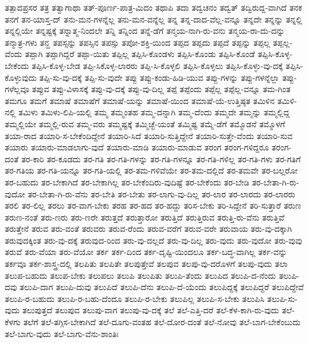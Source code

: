{ತತ್ಪಾದಪ್ರಸರ
ತತ್ರ
ತತ್ವಾಗಾಥಾ
ತತ್‌-ಪೂರ್ಣ-ಪಾತ್ರ-ಮಿದಂ
ತಥಾಪಿ
ತದಾ
ತದ್ವಚನಂ
ತದ್ವತ್
ತದ್ವಿರುದ್ದ-ವಾಗಿದೆ
ತನಕ
ತನಗೆ
ತನ-ಯಾಸ್ತ-‌ದ್
ತನು-ಮನ-ಗಳನ್ನೆಲ್ಲ
ತನು-ಮನ-ವನ್ನೆಲ್ಲ
ತನ್ನ
ತನ್ನ-ದಾದ-ವೆಲ್ಲ-ವನ್ನೂ
ತನ್ನದೇ
ತನ್ನನ್ನು
ತನ್ನಲ್ಲಿ
ತನ್ನಲ್ಲಿಯೇ
ತನ್ನಷ್ಟಕ್ಕೆ
ತನ್ನಾತ್ಮ-ನಿಂದಲೇ
ತನ್ನಿ
ತನ್ನಿಂದ
ತನ್ನೆ-ಡೆಗೆ
ತನ್ಮಯ-ನಾಗಿ-ರು-ವನು
ತನ್ಮಯ-ರಾ-ದು-ದನ್ನು
ತನ್ಮಾತ್ರ-ಗಳು
ತನ್ಹ
ತಪಸ್ಸನ್ನು
ತಪಸ್ಸಿನ
ತಪಸ್ಸು
ತಪೋ-ಶಕ್ತಿ-ಯಿಂದ
ತಪ್ಪದ
ತಪ್ಪದು
ತಪ್ಪದೆ
ತಪ್ಪನ್ನು
ತಪ್ಪಲ್ಲ
ತಪ್ಪಲ್ಲ-ವೆಂದು
ತಪ್ಪಾಗಿ
ತಪ್ಪಾಗಿದ್ದರೆ
ತಪ್ಪಾ-ಯಿತು
ತಪ್ಪಿಲ್ಲ
ತಪ್ಪಿಸಿ-ಕೊಂಡಳು
ತಪ್ಪಿಸಿ-ಕೊಂಡು
ತಪ್ಪಿಸಿ-ಕೊಂಡೆ
ತಪ್ಪಿಸಿ-ಕೊಳ್ಳ-ಬೇಕೆಂದು
ತಪ್ಪಿಸಿ-ಕೊಳ್ಳ-ಬೇಡ
ತಪ್ಪಿ-ಸಿಕೊಳ್ಳ-ಲಾರರು
ತಪ್ಪಿ-ಸಿ-ಕೊಳ್ಳಲಿ
ತಪ್ಪಿಸಿ-ಕೊಳ್ಳಲು
ತಪ್ಪಿಸಿ-ಕೊಳ್ಳು-ವು-ದಕ್ಕೆ
ತಪ್ಪಿಸಿ-ಕೊಳ್ಳುವುದು
ತಪ್ಪಿ-ಸು-ವು-ದಕ್ಕೆ
ತಪ್ಪಿ-ಸು-ವುದೇ
ತಪ್ಪು
ತಪ್ಪು-ಕಂಡು-ಹಿಡಿ-ಯುವ
ತಪ್ಪು-ಗಳನ್ನು
ತಪ್ಪು-ಗಳನ್ನೆಲ್ಲಾ
ತಪ್ಪು-ಗಳೆಲ್ಲವೂ
ತಪ್ಪುವ
ತಪ್ಪು-ವಿಳಾಸಕ್ಕೆ
ತಪ್ಪು-ವು-ದಕ್ಕೆ
ತಪ್ಪು-ವು-ದಿಲ್ಲ
ತಪ್ಪೆ
ತಪ್ಪೆಂದು
ತಪ್ಪೆಲ್ಲ
ತಪ್ಪೆಲ್ಲ-ವನ್ನೂ
ತಮ-ಗಿಂತ
ತಮಗೂ
ತಮಗೆ
ತಮಾಷೆ
ತಮಾಷೆಗೆ
ತಮಾಷೆ-ಯನ್ನು
ತಮಾಷೆ-ಯಿಂದ
ತಮಾಷೆ-ಯೆ-ಉತ್ತಿಷ್ಠತ
ತಮಿಳಿನ
ತಮಿಳಿ-ನಲ್ಲಿ
ತಮಿಳು
ತಮಿಳು-ಲಿಪಿ-ಯಲ್ಲಿ
ತಮ್ಮ
ತಮ್ಮಂತಹ
ತಮ್ಮ-ದನ್ನಾಗಿ
ತಮ್ಮ-ದೆಂದು
ತಮ್ಮದೇ
ತಮ್ಮನ್ನು
ತಮ್ಮಲ್ಲಿದ್ದ
ತಮ್ಮಲ್ಲಿಯೇ
ತಮ್ಮಲ್ಲಿ-ರುವ
ತಮ್ಮ-ವರು
ತಮ್ಮಷ್ಟಕ್ಕೆ
ತಮ್ಮಿಚ್ಛೆ-ಯಂತೆ
ತಮ್ಮಿಷ್ಟ
ತಮ್ಮೆ-ಡೆಗೆ
ತಮ್ಮೊಡನೆ
ತಮ್ಮೊಳಗೆ
ತಯಾ-ರಾದ
ತಯಾರಿ-ಸ-ಬೇಕೆಂದಿದ್ದೇನೆ
ತಯಾರಿ-ಸಿದೆ
ತಯಾರಿ-ಸುತ್ತಿದ್ದೇನೆ
ತಯಾರಿ-ಸುತ್ತೇ-ವೆಂದು
ತಯಾರಿ-ಸುವ
ತಯಾರು
ತಯಾರು-ಮಾಡಲಾಗು-ವುದೆ
ತಯಾರು-ಮಾಡಿ
ತಯಾರು-ಮಾಡುವ
ತರಂಗ
ತರಂಗ-ಗಳಿದ್ದರೂ
ತರಂಗ-ದಂತೆ
ತರ-ಕಾರಿ
ತರ-ಕೂಡದು
ತರ-ಗತಿ
ತರ-ಗತಿ-ಗಳನ್ನು
ತರ-ಗತಿ-ಗಳನ್ನೂ
ತರ-ಗತಿ-ಗಳಿಲ್ಲ
ತರ-ಗತಿ-ಗಳು
ತರ-ಗತಿಗೆ
ತರ-ಗತಿಯ
ತರ-ಗತಿ-ಯನ್ನೂ
ತರ-ಗತಿ-ಯಲ್ಲಿ
ತರ-ತಮ-ಗಳಿವೆಯೇ
ತರ-ತಮ-ದಲ್ಲಿದೆ
ತರ-ತಮವೇ
ತರ-ಬಲ್ಲರೋ
ತರ-ಬಹುದು
ತರ-ಬೇಕಾಗಿದೆ
ತರ-ಬೇಕಾಗಿಲ್ಲ
ತರ-ಬೇಕೆಂದಿರು-ವುದಿಷ್ಟೆ
ತರ-ಬೇಕೆಂದು
ತರ-ಬೇಡಿ
ತರ-ಬೇತಾ-ಗಿ-ರು-ವುದೋ
ತರ-ಬೇತಾ-ಗಿ-ರು-ವೆನು
ತರ-ಬೇತಿ
ತರ-ಬೇತು
ತರ-ಲಾಗು-ವು-ದಿಲ್ಲ
ತರ-ಲಾರ
ತರ-ಲಾರದು
ತರ-ಲಾರರು
ತರಲಿ
ತರ-ಲಿಲ್ಲ
ತರಲು
ತರ-ವಾಗ-ಬೇಕು
ತರಹ
ತರ-ಹದ
ತರ-ಹದ್ದು
ತರಿಸ-ಬೇಕು
ತರಿ-ಸಿದ್ದೇನೆ
ತರಿ-ಸುತ್ತಾರೆ
ತರುಣ
ತರುಣ-ನಂತೆ
ತರು-ಣರು
ತರು-ಣರೇ
ತರುತ್ತದೆ
ತರುತ್ತಾರೋ
ತರುತ್ತಿದೆ
ತರುತ್ತಿರುವ
ತರುತ್ತಿ-ರು-ವೆನು
ತರುತ್ತಿವೆ
ತರುತ್ತೇನೆ
ತರುವ
ತರು-ವಂತೆ
ತರುವರು
ತರುವ-ರೆಂದು
ತರುವ-ವರೆಗೆ
ತರುವ-ವರೇ
ತರುವಾಯ
ತರು-ವು-ದಕ್ಕಾಗಿ
ತರುವುದಕ್ಕಿಂತ
ತರು-ವು-ದಕ್ಕೆ
ತರುವುದ-ರಿಂದ
ತರು-ವು-ದಲ್ಲದೆ
ತರು-ವು-ದಿಲ್ಲ
ತರು-ವುದು
ತರು-ವುದೋ
ತರು-ವುವು
ತರುವೆ
ತರು-ವೆಯಾ
ತರು-ವೆಯೋ
ತರ್ಕ
ತರ್ಕ-ದಿಂದ
ತರ್ಕ-ದೃಷ್ಟಿ-ಯಿಂದಲೂ
ತರ್ಕ-ಬದ್ಧ-ವಾಗಿಲ್ಲ
ತರ್ಕ-ವನ್ನು
ತರ್ಕವೂ
ತರ್ಕ-ಶಾಸ್ತ್ರ-ದಲ್ಲಿ
ತಲಪಿತು
ತಲಪಿತೇ
ತಲಪುತ್ತೇವೆ
ತಲಪುವ
ತಲಪು-ವು-ದರೊಳಗೆ
ತಲಪು-ವುದು
ತಲಾ
ತಲುಪ-ಬಹುದು
ತಲುಪ-ಬೇಕು
ತಲುಪಲು
ತಲುಪಿ
ತಲುಪಿತು
ತಲುಪಿ-ತೆಂದು
ತಲುಪಿದ
ತಲುಪಿ-ದ-ನೆಂದು
ತಲುಪಿ-ದವು
ತಲುಪಿ-ದಾಗ
ತಲುಪಿ-ದುವು
ತಲುಪಿದೆ
ತಲುಪಿ-ದೆನು
ತಲುಪಿ-ದೆ-ಯೆಂದು
ತಲುಪಿದ್ದಕ್ಕೆ
ತಲುಪಿದ್ದರೆ
ತಲುಪಿದ್ದೇವೆ
ತಲುಪಿ-ರ-ಬಹುದು
ತಲುಪಿ-ರ-ಬಹು-ದೆಂದೂ
ತಲುಪಿ-ರ-ಬೇಕು
ತಲುಪಿಲ್ಲ
ತಲುಪಿ-ಸ-ಬೇಕು
ತಲುಪಿಸಿ
ತಲುಪಿ-ಸು-ವುದು
ತಲುಪುತ್ತದೆ
ತಲುಪುವ
ತಲುಪು-ವಾಗ
ತಲುಪು-ವು-ದಕ್ಕೆ
ತಲೆ
ತಲೆ-ಎತ್ತಿ-ದರೆ
ತಲೆ-ಕೆಳ-ಕಾಗಿ-ರು-ವುದು
ತಲೆ-ಕೆಳಗು
ತಲೆಗೆ
ತಲೆ-ತಗ್ಗಿಸ-ಬೇಕಾಗಿದೆ
ತಲೆ-ದೂಗು-ವಂತಹ
ತಲೆ-ದೋರ-ದಂತೆ
ತಲೆ-ನೋವು
ತಲೆ-ಬಾಗ-ಬೇಕೆಂಬುದು
ತಲೆ-ಬಾಗು-ವುದು
ತಲೆ-ಬಾಗು-ವೆನು-ಶಾಂತಿಃ
}
